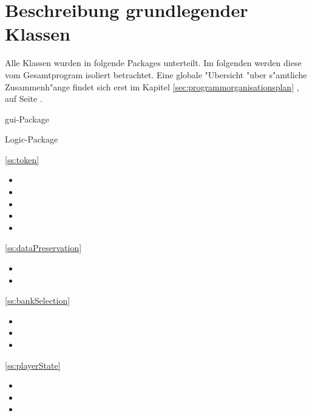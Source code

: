 \section{Beschreibung grundlegender Klassen}
Alle Klassen wurden in folgende Packages unterteilt. Im folgenden werden diese vom Gesamtprogram isoliert betrachtet. Eine globale "Ubersicht "uber s"amtliche Zusammenh"ange findet sich erst im Kapitel \ref{sec:programmorganisationsplan} , auf Seite \pageref{sec:programmorganisationsplan}. 


{\large gui-Package}


{\large Logic-Package}
\begin{multicols}{2}
\begin{itemize}

	\item \ref{ss:token} 
	\begin{itemize}
		\item {}
		\item {}
		\item {}
		\item {}
		\item {}
	\end{itemize}
	\item \ref{ss:dataPreservation} 
	\begin{itemize}
		\item {}
		\item {}
	\end{itemize}
	\item \ref{ss:bankSelection} 
	\begin{itemize}
		\item {}
		\item {}
		\item {}
	\end{itemize}
	\begin{minipage}{\linewidth}
	\item \ref{ss:playerState} 
	\begin{itemize}
		\item {}
		\item {}
		\item {}

\end{itemize}
\end{minipage}
\end{itemize}
\end{multicols}

